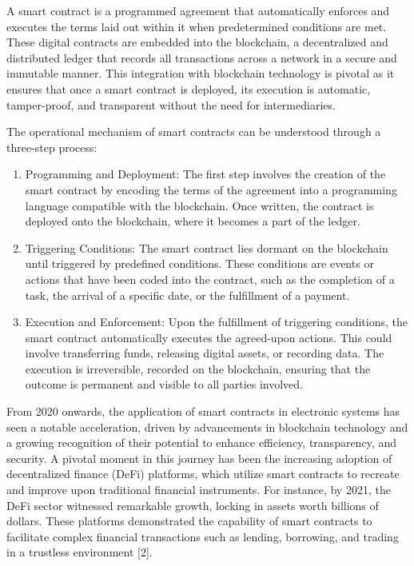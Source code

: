 \begin{multicols}{2}
A smart contract is a programmed agreement that automatically enforces
and executes the terms laid out within it when predetermined conditions
are met. These digital contracts are embedded into the blockchain, a
decentralized and distributed ledger that records all transactions
across a network in a secure and immutable manner. This integration with
blockchain technology is pivotal as it ensures that once a smart
contract is deployed, its execution is automatic, tamper-proof, and
transparent without the need for intermediaries.

The operational mechanism of smart contracts can be understood through a
three-step process:

\begin{enumerate}
\def\labelenumi{\arabic{enumi}.}
\item
  Programming and Deployment: The first step involves the creation of
  the smart contract by encoding the terms of the agreement into a
  programming language compatible with the blockchain. Once written, the
  contract is deployed onto the blockchain, where it becomes a part of
  the ledger.
\item
  Triggering Conditions: The smart contract lies dormant on the
  blockchain until triggered by predefined conditions. These conditions
  are events or actions that have been coded into the contract, such as
  the completion of a task, the arrival of a specific date, or the
  fulfillment of a payment.
\item
  Execution and Enforcement: Upon the fulfillment of triggering
  conditions, the smart contract automatically executes the agreed-upon
  actions. This could involve transferring funds, releasing digital
  assets, or recording data. The execution is irreversible, recorded on
  the blockchain, ensuring that the outcome is permanent and visible to
  all parties involved.
\end{enumerate}

From 2020 onwards, the application of smart contracts in electronic
systems has seen a notable acceleration, driven by advancements in
blockchain technology and a growing recognition of their potential to
enhance efficiency, transparency, and security. A pivotal moment in this
journey has been the increasing adoption of decentralized finance (DeFi)
platforms, which utilize smart contracts to recreate and improve upon
traditional financial instruments. For instance, by 2021, the DeFi
sector witnessed remarkable growth, locking in assets worth billions of
dollars. These platforms demonstrated the capability of smart contracts
to facilitate complex financial transactions such as lending, borrowing,
and trading in a trustless environment {[}2{]}.


\end{multicols}
